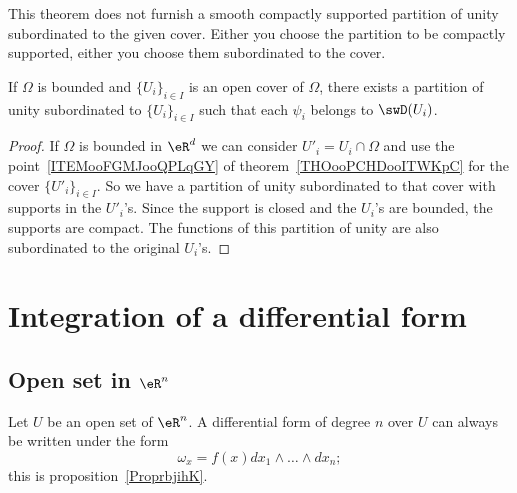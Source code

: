 \begin{remark}
    This theorem does not furnish a smooth compactly supported partition of unity subordinated to the given cover. Either you choose the partition to be compactly supported, either you choose them subordinated to the cover.
\end{remark}

\begin{corollary}  \label{CORooMSWPooCxvuhm}
    If \( \Omega\) is bounded and \( \{U_i \}_{i\in I}\) is an open cover of \( \Omega\), there exists a partition of unity subordinated to \( \{ U_i \}_{i\in I}\) such that each \( \psi_i\) belongs to \( \swD(U_i)\).
\end{corollary}

\begin{proof}
    If \( \Omega\) is bounded in \( \eR^d\) we can consider \( U'_i=U_i\cap \Omega\) and use the point~\ref{ITEMooFGMJooQPLqGY} of theorem~\ref{THOooPCHDooITWKpC} for the cover \( \{ U'_i \}_{i\in I}\). So we have a partition of unity subordinated to that cover with supports in the \( U'_i\)'s. Since the support is closed and the \( U_i\)'s are bounded, the supports are compact. The functions of this partition of unity are also subordinated to the original \( U_i\)'s.
\end{proof}

\section{Integration of a differential form}

\subsection{Open set in \( \eR^n\)}

Let \( U\) be an open set of \( \eR^n\). A differential form of degree \( n\) over \( U\) can always be written under the form
\begin{equation}
    \omega_x=f(x)dx_1\wedge\ldots\wedge dx_n;
\end{equation}
this is proposition~\ref{ProprbjihK}.

